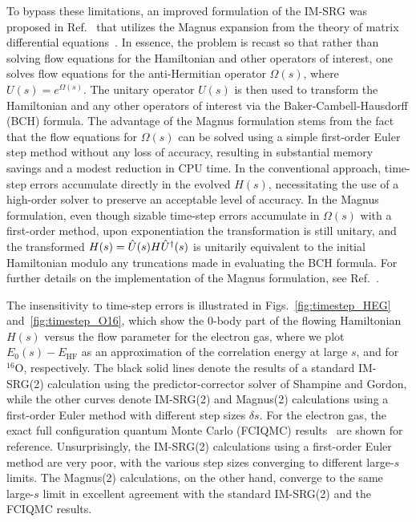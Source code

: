 To bypass these limitations, an improved formulation of the IM-SRG was
proposed in Ref.~\cite{Morris:2015ve} that utilizes the Magnus
expansion from the theory of matrix differential
equations~\cite{Magnus:1954xy,Blanes:2009fk}.  In essence, the problem
is recast so that rather than solving flow equations for the
Hamiltonian and other operators of interest, one solves flow equations
for the anti-Hermitian operator $\Omega(s)$, where $U(s) =
e^{\Omega(s)}$. The unitary operator $U(s)$ is then used to transform
the Hamiltonian and any other operators of interest via the
Baker-Cambell-Hausdorff (BCH) formula. The advantage of the Magnus
formulation stems from the fact that the flow equations for
$\Omega(s)$ can be solved using a simple first-order Euler step method
without any loss of accuracy, resulting in substantial memory savings
and a modest reduction in CPU time.  In the conventional approach,
time-step errors accumulate directly in the evolved $H(s)$,
necessitating the use of a high-order solver to preserve an acceptable
level of accuracy.  In the Magnus formulation, even though sizable
time-step errors accumulate in $\Omega(s)$ with a first-order method, 
upon exponentiation the transformation is still unitary, and
the transformed $H(s)=\hat{U}(s)H\hat{U}^\dag(s)$ is unitarily equivalent to
the initial Hamiltonian modulo any truncations made in evaluating the BCH formula.  For
further details on the implementation of the Magnus formulation, see
Ref.~\cite{Morris:2015ve}.

The insensitivity to time-step errors is illustrated in
Figs.~\ref{fig:timestep_HEG} and~\ref{fig:timestep_O16}, which show
the 0-body part of the flowing Hamiltonian $H(s)$ versus the flow
parameter for the electron gas, where we plot $E_0(s)-E_\text{HF}$ as an
approximation of the correlation energy at large $s$, and for
$^{16}$O, respectively. The black solid lines denote the results of a
standard IM-SRG(2) calculation using the predictor-corrector solver of
Shampine and Gordon, while the other curves denote IM-SRG(2) and
Magnus(2) calculations using a first-order Euler method with different
step sizes $\delta s$. For the electron gas, the exact full
configuration quantum Monte Carlo (FCIQMC)
results~\cite{Shepherd:2012hl} are shown for
reference. Unsurprisingly, the IM-SRG(2) calculations using a
first-order Euler method are very poor, with the various step sizes
converging to different large-$s$ limits. The Magnus(2) calculations,
on the other hand, converge to the same large-$s$ limit in excellent
agreement with the standard IM-SRG(2) and the FCIQMC results.

